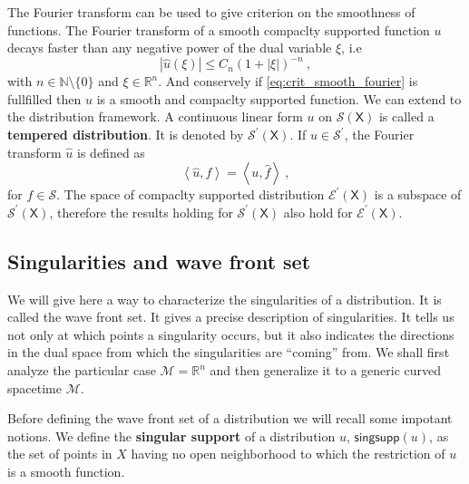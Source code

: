 \documentclass[12pt]{book}
\newcommand{\singsupp}{\mathsf{singsupp}}
\newcommand{\abs}[1]{\left|#1\right|}
\newcommand{\sm}[1]{\left\langle#1\right\rangle}
\newcommand{\Ecal}{\mathcal{E}}
\newcommand{\Mcal}{\mathcal{M}}
\newcommand{\Scal}{\mathcal{S}}
\newcommand{\Nbb}{\mathbb{N}}
\newcommand{\Rbb}{\mathbb{R}}
\newcommand{\Xsf}{\mathsf{X}}
\theoremstyle{break}
\begin{document}
%
The Fourier transform can be used to give criterion on the smoothness of functions. The Fourier transform of a smooth compaclty supported function $u$ decays faster than any negative power of the dual variable $\xi$, i.e
%
\begin{equation}
\abs{\hat{u}(\xi)} \leq C_n (1+\abs{\xi})^{-n} \ ,
\label{eq:crit_smooth_fourier}
\end{equation}
%
with $n \in \Nbb \setminus \{0\}$ and $\xi \in \Rbb^n$. And conservely if \eqref{eq:crit_smooth_fourier} is fullfilled then $u$ is a smooth and compaclty supported function. We can extend to the distribution framework. A continuous linear form $u$ on $\Scal(\Xsf)$ is called a \textbf{tempered distribution}. It is denoted by $\Scal^\prime(\Xsf)$. 
%
If $u \in \Scal^\prime$, the Fourier transform $\hat{u}$ is defined as 
%
\begin{equation*}
\sm{\hat{u},f} = \sm{u,\hat{f}} \ ,
\end{equation*}
%
for $f \in \Scal$. The space of compaclty supported distribution $\Ecal^\prime(\Xsf)$ is a subspace of $\Scal^\prime(\Xsf)$, therefore the results holding for $\Scal^\prime(\Xsf)$ also hold for $\Ecal^\prime(\Xsf)$. 


\subsection{Singularities and wave front set}\label{p:SING_WF}

We will give here a way to characterize the singularities of a distribution. It is called the wave front set. It gives a precise description of singularities. It tells us not only at which points a singularity occurs, but it also indicates the directions in the dual space from which the singularities are ``coming'' from. We shall first analyze the particular case $\Mcal = \Rbb^n$ and then generalize it to a generic curved spacetime $\Mcal$. 




Before defining the wave front set of a distribution we will recall some impotant notions. We define the \textbf{singular support} of a distribution $u$, $\singsupp(u)$, as the set of points in $X$ having no open neighborhood to which the restriction of $u$ is a smooth function. 
\end{document}
